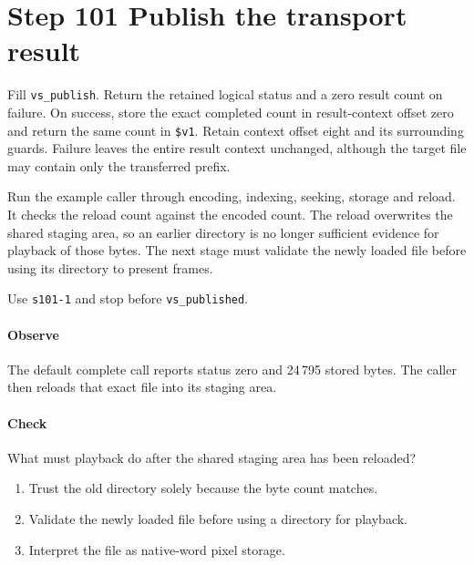 \section{Step 101 Publish the transport result}
Fill \texttt{vs\_publish}. Return the retained logical status and a zero result count on failure. On success, store the exact completed count in result-context offset zero and return the same count in \texttt{\$v1}. Retain context offset eight and its surrounding guards. Failure leaves the entire result context unchanged, although the target file may contain only the transferred prefix.

Run the example caller through encoding, indexing, seeking, storage and reload. It checks the reload count against the encoded count. The reload overwrites the shared staging area, so an earlier directory is no longer sufficient evidence for playback of those bytes. The next stage must validate the newly loaded file before using its directory to present frames.

Use \texttt{s101-1} and stop before \texttt{vs\_published}.

\paragraph{Observe} The default complete call reports status zero and 24\,795 stored bytes. The caller then reloads that exact file into its staging area.

\paragraph{Check} What must playback do after the shared staging area has been reloaded?
\begin{enumerate}[label=\Alph*.]
  \item Trust the old directory solely because the byte count matches.
  \item Validate the newly loaded file before using a directory for playback.
  \item Interpret the file as native-word pixel storage.
\end{enumerate}
